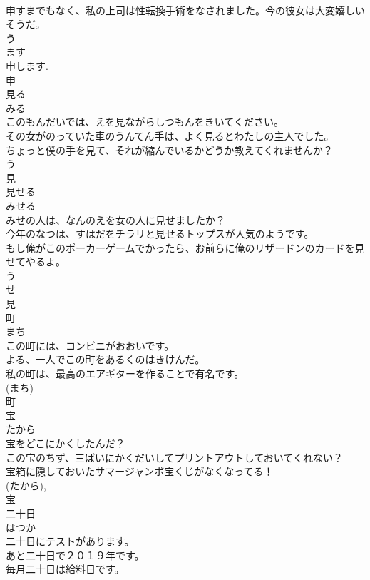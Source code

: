 \documentclass[8pt]{extreport}
\begin{document}
\begin{CJK}{UTF8}{min}
\\	申すまでもなく、私の上司は性転換手術をなされました。今の彼女は大変嬉しいそうだ。	
\\	う 
\\	ます 
\\	申します. 
\\	申	
\\	見る	
\\	みる	
\\	このもんだいでは、えを見ながらしつもんをきいてください。	
\\	その女がのっていた車のうんてん手は、よく見るとわたしの主人でした。	
\\	ちょっと僕の手を見て、それが縮んでいるかどうか教えてくれませんか？	
\\	う 
\\	見	
\\	見せる	
\\	みせる	
\\	みせの人は、なんのえを女の人に見せましたか？	
\\	今年のなつは、すはだをチラリと見せるトップスが人気のようです。	
\\	もし俺がこのポーカーゲームでかったら、お前らに俺のリザードンのカードを見せてやるよ。	
\\	う 
\\	せ 
\\	見	
\\	町	
\\	まち	
\\	この町には、コンビニがおおいです。	
\\	よる、一人でこの町をあるくのはきけんだ。	
\\	私の町は、最高のエアギターを作ることで有名です。	
\\	(まち) 
\\	町	
\\	宝	
\\	たから	
\\	宝をどこにかくしたんだ？	
\\	この宝のちず、三ばいにかくだいしてプリントアウトしておいてくれない？	
\\	宝箱に隠しておいたサマージャンボ宝くじがなくなってる！	
\\	(たから), 
\\	宝	
\\	二十日	
\\	はつか	
\\	二十日にテストがあります。	
\\	あと二十日で２０１９年です。	
\\	毎月二十日は給料日です。	

\end{CJK}
\end{document}
